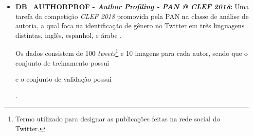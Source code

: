     \begin{itemize}
        \item \textbf{DB\_AUTHORPROF - \textit{Author Profiling - PAN @ CLEF 2018}:} Uma tarefa da competição \textit{CLEF 2018} promovida pela PAN na classe de análise de autoria, a qual foca na identificação de gênero no Twitter em três linguagens distintas, inglês, espanhol, e árabe \cite{PAN_APCLEF_2018}.
        
        Os dados consistem de 100 \textit{tweets}\footnote{Termo utilizado para designar as publicações feitas na rede social do Twitter.} e 10 imagens para cada autor, sendo que o conjunto de treinamento possui 
        e o conjunto de validação possui
        \cite{rangel2018overview}.
        

\end{itemize}
